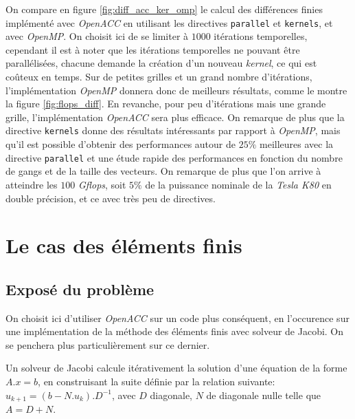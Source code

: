 \documentclass{article}
\begin{document}
On compare en figure \ref{fig:diff_acc_ker_omp} le calcul des différences finies implémenté avec \textit{OpenACC} en utilisant les directives \texttt{parallel} et \texttt{kernels}, et avec \textit{OpenMP}. On choisit ici de se limiter à $1000$ itérations temporelles, cependant il est à noter que les itérations temporelles ne pouvant être parallélisées, chacune demande la création d'un nouveau \textit{kernel}, ce qui est coûteux en temps. Sur de petites grilles et un grand nombre d'itérations, l'implémentation \textit{OpenMP} donnera donc de meilleurs résultats, comme le montre la figure \ref{fig:flops_diff}. En revanche, pour peu d'itérations mais une grande grille, l'implémentation \textit{OpenACC} sera plus efficace. On remarque de plus que la directive \texttt{kernels} donne des résultats intéressants par rapport à \textit{OpenMP}, mais qu'il est possible d'obtenir des performances autour de $25\%$ meilleures avec la directive \texttt{parallel} et une étude rapide des performances en fonction du nombre de gangs et de la taille des vecteurs. On remarque de plus que l'on arrive à atteindre les $100$ \textit{G\gls{flops}}, soit $5\%$ de la puissance nominale de la \textit{Tesla K80} en double précision, et ce avec très peu de directives.

\FloatBarrier

\section{Le cas des éléments finis}

\subsection{Exposé du problème}

On choisit ici d'utiliser \textit{OpenACC} sur un code plus conséquent, en l'occurence sur une implémentation de la méthode des éléments finis avec solveur de Jacobi. On se penchera plus particulièrement sur ce dernier.

Un solveur de Jacobi calcule itérativement la solution d'une équation de la forme $A . x = b$, en construisant la suite définie par la relation suivante: $u_{k+1} = (b - N . u_k) . D^{-1}$, avec $D$ diagonale, $N$ de diagonale nulle telle que $A = D + N$.
\end{document}
